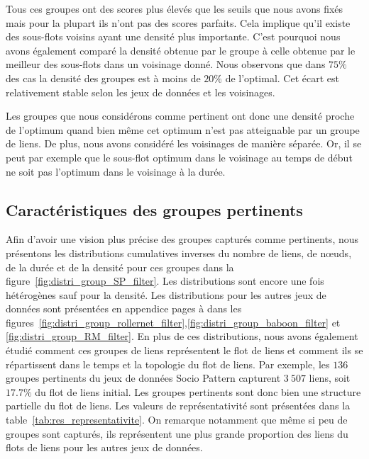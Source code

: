 Tous ces groupes ont des scores plus élevés que les seuils que nous avons fixés mais pour la plupart ils n'ont pas des scores parfaits.
Cela implique qu'il existe des sous-flots voisins ayant une densité plus importante.
C'est pourquoi nous avons également comparé la densité obtenue par le groupe à celle obtenue par le meilleur des sous-flots dans un voisinage donné.
Nous observons que dans $75\%$ des cas la densité des groupes est à moins de $20\%$ de l'optimal.
Cet écart est relativement stable selon les jeux de données et les voisinages.

Les groupes que nous considérons comme pertinent ont donc une densité proche de l'optimum quand bien même cet optimum n'est pas atteignable par un groupe de liens.
De plus, nous avons considéré les voisinages de manière séparée.
Or, il se peut par exemple que le sous-flot optimum dans le voisinage au temps de début ne soit pas l'optimum dans le voisinage à la durée.


\subsection{Caractéristiques des groupes pertinents}

Afin d'avoir une vision plus précise des groupes capturés comme pertinents, nous présentons les distributions cumulatives inverses du nombre de liens, de n\oe uds, de la durée et de la densité pour ces groupes dans la figure~\ref{fig:distri_group_SP_filter}.
Les distributions sont encore une fois hétérogènes sauf pour la densité.
Les distributions pour les autres jeux de données sont présentées en appendice pages \pageref{fig:distri_group_rollernet_filter} à \pageref{fig:distri_group_RM_filter} dans les figures~\ref{fig:distri_group_rollernet_filter},\ref{fig:distri_group_baboon_filter} et \ref{fig:distri_group_RM_filter}.
En plus de ces distributions, nous avons également étudié comment ces groupes de liens représentent le flot de liens et comment ils se répartissent dans le temps et la topologie du flot de liens.
Par exemple, les $136$ groupes pertinents du jeux de données Socio Pattern capturent $3\ 507$ liens, soit $17.7\%$ du flot de liens initial.
Les groupes pertinents sont donc bien une structure partielle du flot de liens.
Les valeurs de représentativité sont présentées dans la table~\ref{tab:res_representativite}.
On remarque notamment que même si peu de groupes sont capturés, ils représentent une plus grande proportion des liens du flots de liens pour les autres jeux de données.


